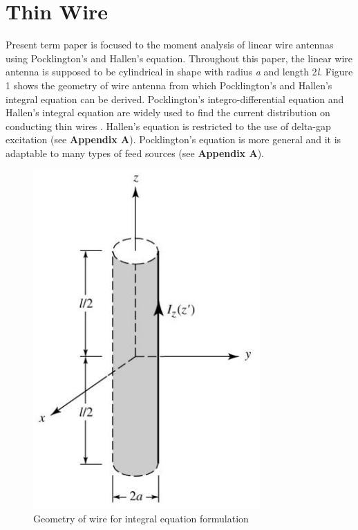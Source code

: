 \documentclass[aps,prstab,twocolumn,superscriptaddress,groupedaddress,showkeys,nofootinbib]{revtex4}  %
\begin{document}
\section{Thin Wire}
Present term paper is focused to the moment analysis of linear wire antennas using Pocklington's and Hallen's equation. Throughout this paper, the linear wire antenna is supposed to be cylindrical in shape with radius \textit{a} and length 2\textit{l}. Figure 1 shows the geometry of wire antenna from which Pocklington's and Hallen's integral equation can be derived. Pocklington's integro-differential equation and Hallen's integral equation are widely used to find the current distribution on conducting thin wires \cite{sadiku}. Hallen's equation is restricted to the use of delta-gap excitation (see \textbf{Appendix A}). Pocklington's equation is more general and it is adaptable to many types of feed sources (see \textbf{Appendix A}).
\begin{figure}[here!]
\centering
\includegraphics[scale=0.5]{image1.jpg}
\caption{Geometry of wire for integral equation formulation}
\end{figure}
\end{document}
